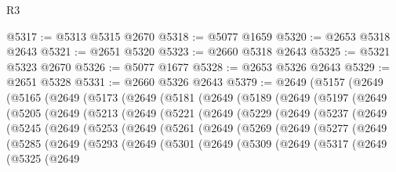 \begin{lexlean}{R3}
\begin{coremodule}
@5317 := @5313 @5315 @2670
@5318 := @5077 @1659
@5320 := @2653 @5318 @2643
@5321 := @2651 @5320
@5323 := @2660 @5318 @2643
@5325 := @5321 @5323 @2670
@5326 := @5077 @1677
@5328 := @2653 @5326 @2643
@5329 := @2651 @5328
@5331 := @2660 @5326 @2643
@5379 := @2649
    (@5157
      (@2649
        (@5165
          (@2649
            (@5173
              (@2649
                (@5181
                  (@2649
                    (@5189
                      (@2649
                        (@5197
                          (@2649
                            (@5205
                              (@2649
                                (@5213
                                  (@2649
                                    (@5221
                                      (@2649
                                        (@5229
                                          (@2649
                                            (@5237
                                              (@2649
                                                (@5245
                                                  (@2649
                                                    (@5253
                                                      (@2649
                                                        (@5261
                                                          (@2649
                                                            (@5269
                                                              (@2649
                                                                (@5277
                                                                  (@2649
                                                                    (@5285
                                                                      (@2649
                                                                        (@5293
                                                                          (@2649
                                                                            (@5301
                                                                              (@2649
                                                                                (@5309
                                                                                  (@2649
                                                                                    (@5317
                                                                                      (@2649
                                                                                        (@5325
                                                                                          (@2649

\end{coremodule}
\end{lexlean}
